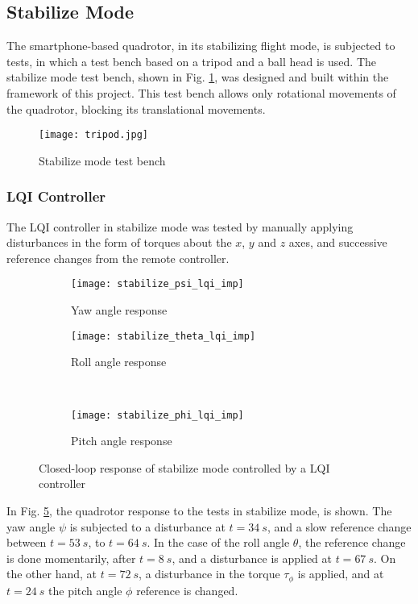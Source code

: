 \subsection{Stabilize Mode}
The smartphone-based quadrotor, in its stabilizing flight mode, is subjected to tests, in which a test bench based on a tripod and a ball head is used. The stabilize mode test bench, shown in Fig. \ref{fig:tripod}, was designed and built within the framework of this project. This test bench allows only rotational movements of the quadrotor, blocking its translational movements.
\begin{figure}[h]
\begin{center}
\texttt{[image: tripod.jpg]}  
\caption{Stabilize mode test bench} 
\label{fig:tripod}
\end{center}
\end{figure}

\subsubsection{LQI Controller}
The LQI controller in stabilize mode was tested by manually applying disturbances in the form of torques about the $x$, $y$ and $z$ axes, and successive reference changes from the remote controller.
\begin{figure}[H]
\begin{subfigure}{.5\linewidth}
\centering
\texttt{[image: stabilize\_psi\_lqi\_imp]}
\caption{Yaw angle response}
\label{fig:stabilize_psi_lqi_imp}
\end{subfigure}%
\begin{subfigure}{.5\linewidth}
\centering
\texttt{[image: stabilize\_theta\_lqi\_imp]}
\caption{Roll angle response}
\label{fig:stabilize_theta_lqi_imp}
\end{subfigure}\\[1ex]
\begin{subfigure}{\linewidth}
\centering
\texttt{[image: stabilize\_phi\_lqi\_imp]}
\caption{Pitch angle response}
\label{fig:stabilize_psi_lqi_imp}
\end{subfigure}
\caption{Closed-loop response of stabilize mode controlled by a LQI controller}
\label{fig:stabilize_lqi_imp}
\end{figure}
In Fig. \ref{fig:stabilize_lqi_imp}, the quadrotor response to the tests in stabilize mode, is shown. The yaw angle $\psi$ is subjected to a disturbance at $t = 34\ s$, and a slow reference change between $t = 53\ s$, to $t = 64\ s$. In the case of the roll angle $\theta$, the reference change is done momentarily, after $t = 8\ s$, and a disturbance is applied at $t = 67\ s$. On the other hand, at $t = 72\ s$, a disturbance in the torque $\tau_\phi$ is applied, and at $t = 24\ s$ the pitch angle $\phi$ reference is changed.

